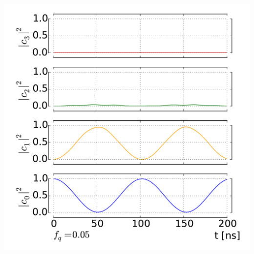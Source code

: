 \documentclass[aspectratio=169, 13pt, t]{beamer}
\begin{document}
{\begin{columns}[c]
\includegraphics[width=\textwidth]{tr_int_dr}
\end{columns}
}
\end{document}
